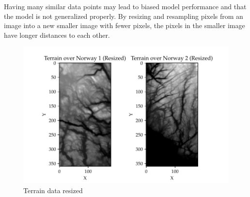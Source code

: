 \documentclass[11pt, a4paper]{article}
\begin{document}
Having many similar data points may lead to biased model performance and that the model is not generalized properly. By resizing and resampling pixels from an image 
into a new smaller image with fewer pixels, the pixels in the smaller image have longer distances to each other.
\begin{figure}
  \centering
  \includegraphics[scale=0.75]{figures/EX6_terrain_data_resized.pdf}
  \caption{Terrain data resized}
  \label{fig:terrain_resized}
\end{figure}
\end{document}
